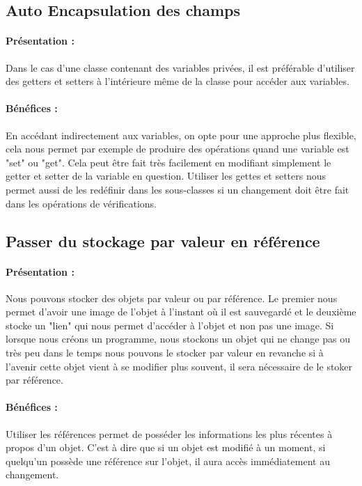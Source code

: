 \documentclass[a4paper,twoside,12pt,openright]{report}
\begin{document}
\subsection{Auto Encapsulation des champs}
\paragraph{Présentation :}
Dans le cas d'une classe contenant des variables privées, il est préférable d'utiliser des getters et setters à l'intérieure même de la classe pour accéder aux variables.

\paragraph{Bénéfices :}
En accédant indirectement aux variables, on opte pour une approche plus flexible, cela nous permet par exemple de produire des opérations quand une variable est "set" ou "get". Cela peut être fait très facilement en modifiant simplement le getter et setter de la variable en question.
Utiliser les gettes et setters nous permet aussi de les redéfinir dans les sous-classes si un changement doit être fait dans les opérations de vérifications.\\

\subsection{Passer du stockage par valeur en référence}
\paragraph{Présentation :}
Nous pouvons stocker des objets par valeur ou par référence. Le premier nous permet d'avoir une image de l'objet à l'instant où il est sauvegardé et le deuxième stocke un "lien" qui nous permet d'accéder à l'objet et non pas une image.
Si lorsque nous créons un programme, nous stockons un objet qui ne change pas ou très peu dans le temps nous pouvons le stocker par valeur en revanche si à l'avenir cette objet vient à se modifier plus souvent, il sera nécessaire de le stoker par référence.

\paragraph{Bénéfices :}
Utiliser les références permet de posséder les informations les plus récentes à propos d'un objet. C'est à dire que si un objet est modifié à un moment, si quelqu'un possède une référence sur l'objet, il aura accès immédiatement au changement.
\end{document}
